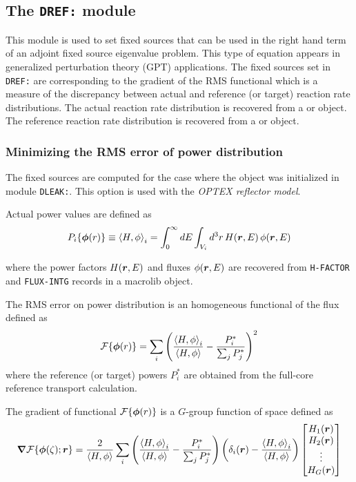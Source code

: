 \subsection{The {\tt DREF:} module}\label{sect:DREFData}

This module is used to set fixed sources that can be used in the right hand term of an adjoint
fixed source eigenvalue problem. This type of equation appears in generalized perturbation theory (GPT) applications.
The fixed sources set in {\tt DREF:} are corresponding to the gradient of the RMS functional which is a measure of
the discrepancy between actual and reference (or target) reaction rate distributions. The actual reaction rate distribution
is recovered from a  or  object. The reference reaction rate distribution is recovered from 
a  or  object.

\subsubsection{Minimizing the RMS error of power distribution}

The fixed sources are computed for the case where the  object was initialized in module {\tt DLEAK:}. This option is used with the {\sl OPTEX
reflector model}.\cite{optex3}

Actual power values are defined as
$$
P_i\{\bff(\phi)(r)\}\equiv \left< H , \phi \right>_i=\int_0^\infty dE \int_{V_i} d^3r \, H(\bff(r),E) \, \phi(\bff(r),E)
$$

\noindent where the power factors $H(\bff(r),E)$ and fluxes $\phi(\bff(r),E)$ are recovered from {\tt H-FACTOR} and 
{\tt FLUX-INTG} records in a {\sc macrolib} object.

\vskip 0.08cm

The RMS error on power distribution is an homogeneous functional of the flux defined as
$$
{\cal F}\{\bff(\phi)(r)\}=\sum_i \left({\left< H , \phi \right>_i\over \left< H , \phi \right>} - {P^*_i\over \sum_j P^*_j} \right)^2
$$
\noindent where the reference (or target) powers $P^*_i$ are obtained from the full-core reference transport calculation.

\vskip 0.08cm

The gradient of functional ${\cal F}\{\bff(\phi)(r)\}$ is a $G$-group function of space defined as
\begin{align*}
\bff(\nabla){\cal F}\{\bff(\phi)(\zeta);\bff(r)\}={2\over \left< H , \phi \right>} \sum_i  \left({\left< H , \phi \right>_i\over \left< H , \phi \right>} -
{P^*_i\over \sum_j P^*_j}\right)\left( \delta_i(\bff(r))-{\left< H , \phi \right>_i\over \left< H , \phi \right>} \right) \left[\begin{matrix}H_1(\bff(r))\cr H_2(\bff(r)) \cr \vdots \cr H_G(\bff(r)) \end{matrix}\right]
\end{align*}

